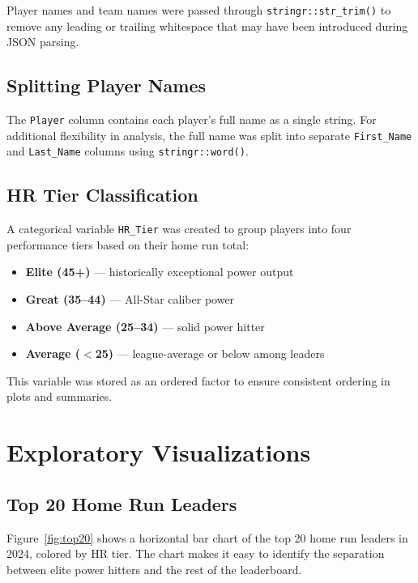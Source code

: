 \documentclass[12pt]{article}
\begin{document}
Player names and team names were passed through \texttt{stringr::str\_trim()} to remove any leading or trailing whitespace that may have been introduced during JSON parsing.
 
\subsection{Splitting Player Names}
 
The \texttt{Player} column contains each player's full name as a single string. For additional flexibility in analysis, the full name was split into separate \texttt{First\_Name} and \texttt{Last\_Name} columns using \texttt{stringr::word()}.
 
\subsection{HR Tier Classification}
 
A categorical variable \texttt{HR\_Tier} was created to group players into four performance tiers based on their home run total:
 
\begin{itemize}
  \item \textbf{Elite (45+)} --- historically exceptional power output
  \item \textbf{Great (35--44)} --- All-Star caliber power
  \item \textbf{Above Average (25--34)} --- solid power hitter
  \item \textbf{Average ($<$25)} --- league-average or below among leaders
\end{itemize}
 
This variable was stored as an ordered factor to ensure consistent ordering in plots and summaries.

\section{Exploratory Visualizations}
 
\subsection{Top 20 Home Run Leaders}
 
Figure~\ref{fig:top20} shows a horizontal bar chart of the top 20 home run leaders in 2024, colored by HR tier. The chart makes it easy to identify the separation between elite power hitters and the rest of the leaderboard.
 
\end{document}
